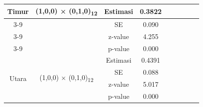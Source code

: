 \begin{table}[H]
\begin{tabular}{|c|c|c|c|c|c|c|c|c|}
        \multirow{4}{*}{Timur}
        & \multirow{4}{*}{(1,0,0) × (0,1,0)\textsubscript{12}}
        & Estimasi & 0.3822 &  &  &  &  &  \\ \cline{3-9}
        &  & SE       & 0.090  &  &  &  &  &  \\ \cline{3-9}
        &  & z-value  & 4.255 &  &  &  &  &  \\ \cline{3-9}
        &  & p-value  & 0.000 &  &  &  &  &  \\ \hline

        \multirow{4}{*}{Utara}
        & \multirow{4}{*}{(1,0,0) × (0,1,0)\textsubscript{12}}
        & Estimasi & 0.4391 &  &  &  &  &  \\ \cline{3-9}
        &  & SE       & 0.088  &  &   &  &  &  \\ \cline{3-9}
        &  & z-value  & 5.017 &  &  &  &  &  \\ \cline{3-9}
        &  & p-value  & 0.000 &  &   &  &  &  \\ \hline

    \end{tabular}
\end{table}